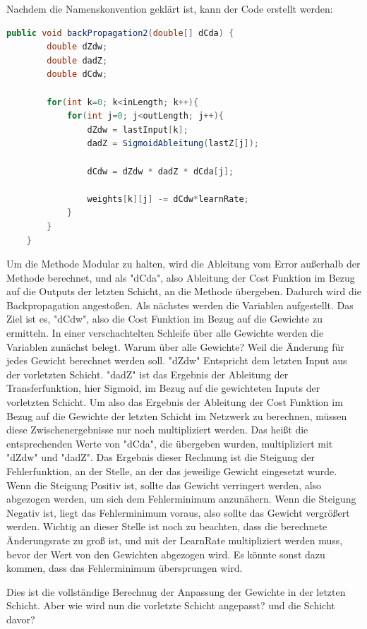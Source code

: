 \documentclass[12pt]{article}
\begin{document}
Nachdem die Namenskonvention geklärt ist, kann der Code erstellt werden:

\begin{lstlisting}[language=Java] 
    public void backPropagation2(double[] dCda) {
        double dZdw;
        double dadZ;
        double dCdw;

        for(int k=0; k<inLength; k++){
            for(int j=0; j<outLength; j++){
                dZdw = lastInput[k];
                dadZ = SigmoidAbleitung(lastZ[j]);

                dCdw = dZdw * dadZ * dCda[j];

                weights[k][j] -= dCdw*learnRate;
            }
        }
    }
\end{lstlisting} 

Um die Methode Modular zu halten, wird die Ableitung vom Error außerhalb der Methode berechnet, und als "dCda", also Ableitung der Cost Funktion im Bezug auf die Outputs der letzten Schicht, an die Methode übergeben. Dadurch wird die Backpropagation angestoßen. Als nächstes werden die Variablen aufgestellt. Das Ziel ist es, "dCdw", also die Cost Funktion im Bezug auf die Gewichte zu ermitteln. 
In einer verschachtelten Schleife über alle Gewichte werden die Variablen zunächst belegt.
Warum über alle Gewichte? Weil die Änderung für jedes Gewicht berechnet werden soll. 
"dZdw" Entspricht dem letzten Input aus der vorletzten Schicht. "dadZ" ist das Ergebnis der Ableitung der Transferfunktion, hier Sigmoid, im Bezug auf die gewichteten Inputs der vorletzten Schicht.
Um also das Ergebnis der Ableitung der Cost Funktion im Bezug auf die Gewichte der letzten Schicht im Netzwerk zu berechnen, müssen diese Zwischenergebnisse nur noch multipliziert werden. Das heißt die entsprechenden Werte von "dCda", die übergeben wurden, multipliziert mit "dZdw" und "dadZ".
Das Ergebnis dieser Rechnung ist die Steigung der Fehlerfunktion, an der Stelle, an der das jeweilige Gewicht eingesetzt wurde. Wenn die Steigung Positiv ist, sollte das Gewicht verringert werden, also abgezogen werden, um sich dem Fehlerminimum anzunähern.
Wenn die Steigung Negativ ist, liegt das Fehlerminimum voraus, also sollte das Gewicht vergrößert werden.
Wichtig an dieser Stelle ist noch zu beachten, dass die berechnete Änderungsrate zu groß ist, und mit der LearnRate multipliziert werden muss, bevor der Wert von den Gewichten abgezogen wird. Es könnte sonst dazu kommen, dass das Fehlerminimum übersprungen wird.

Dies ist die vollständige Berechnug der Anpassung der Gewichte in der letzten Schicht. Aber wie wird nun die vorletzte Schicht angepasst? und die Schicht davor?
\end{document}
